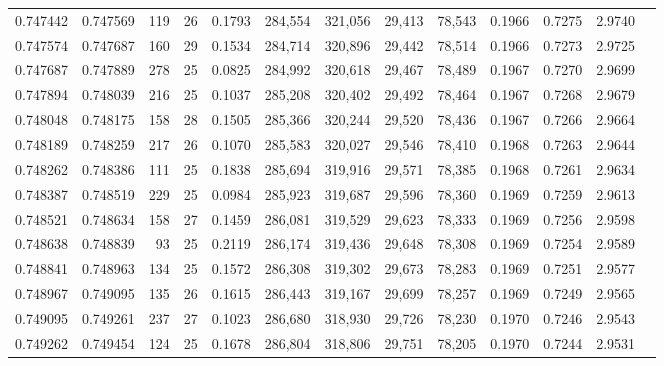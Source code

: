 \begin{tabular}{rrrrrrrrrrrrr}
0.747442 & 0.747569 &   119 &  26 &                                     0.1793 & 284,554 & 321,056 &  29,413 &  78,543 & 0.1966 & 0.7275 & 2.9740 \\
0.747574 & 0.747687 &   160 &  29 &                                     0.1534 & 284,714 & 320,896 &  29,442 &  78,514 & 0.1966 & 0.7273 & 2.9725 \\
0.747687 & 0.747889 &   278 &  25 &                                     0.0825 & 284,992 & 320,618 &  29,467 &  78,489 & 0.1967 & 0.7270 & 2.9699 \\
0.747894 & 0.748039 &   216 &  25 &                                     0.1037 & 285,208 & 320,402 &  29,492 &  78,464 & 0.1967 & 0.7268 & 2.9679 \\
0.748048 & 0.748175 &   158 &  28 &                                     0.1505 & 285,366 & 320,244 &  29,520 &  78,436 & 0.1967 & 0.7266 & 2.9664 \\
0.748189 & 0.748259 &   217 &  26 &                                     0.1070 & 285,583 & 320,027 &  29,546 &  78,410 & 0.1968 & 0.7263 & 2.9644 \\
0.748262 & 0.748386 &   111 &  25 &                                     0.1838 & 285,694 & 319,916 &  29,571 &  78,385 & 0.1968 & 0.7261 & 2.9634 \\
0.748387 & 0.748519 &   229 &  25 &                                     0.0984 & 285,923 & 319,687 &  29,596 &  78,360 & 0.1969 & 0.7259 & 2.9613 \\
0.748521 & 0.748634 &   158 &  27 &                                     0.1459 & 286,081 & 319,529 &  29,623 &  78,333 & 0.1969 & 0.7256 & 2.9598 \\
0.748638 & 0.748839 &    93 &  25 &                                     0.2119 & 286,174 & 319,436 &  29,648 &  78,308 & 0.1969 & 0.7254 & 2.9589 \\
0.748841 & 0.748963 &   134 &  25 &                                     0.1572 & 286,308 & 319,302 &  29,673 &  78,283 & 0.1969 & 0.7251 & 2.9577 \\
0.748967 & 0.749095 &   135 &  26 &                                     0.1615 & 286,443 & 319,167 &  29,699 &  78,257 & 0.1969 & 0.7249 & 2.9565 \\
0.749095 & 0.749261 &   237 &  27 &                                     0.1023 & 286,680 & 318,930 &  29,726 &  78,230 & 0.1970 & 0.7246 & 2.9543 \\
0.749262 & 0.749454 &   124 &  25 &                                     0.1678 & 286,804 & 318,806 &  29,751 &  78,205 & 0.1970 & 0.7244 & 2.9531 \\

\end{tabular}
